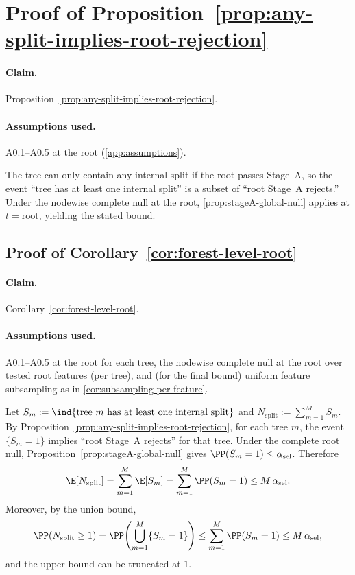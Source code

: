 \section{Proof of Proposition~\ref{prop:any-split-implies-root-rejection}}
\label{app:proof-root}

\paragraph{Claim.} Proposition~\ref{prop:any-split-implies-root-rejection}.
\paragraph{Assumptions used.} A0.1--A0.5 at the root (\cref{app:assumptions}).

The tree can only contain any internal split if the root passes Stage~A, so the
event ``tree has at least one internal split'' is a subset of ``root Stage~A
rejects.'' Under the nodewise complete null at the root, \cref{prop:stageA-global-null}
applies at $t = \mathrm{root}$, yielding the stated bound.

\subsection{Proof of Corollary~\ref{cor:forest-level-root}}
\label{app:proof-forest-level-root}

\paragraph{Claim.} Corollary~\ref{cor:forest-level-root}.
\paragraph{Assumptions used.} A0.1--A0.5 at the root for each tree, the nodewise
complete null at the root over tested root features (per tree), and (for the final bound)
uniform feature subsampling as in \cref{cor:subsampling-per-feature}.

Let $S_m := \ind\{\text{tree $m$ has at least one internal split}\}$ and
$N_{\mathrm{split}} := \sum_{m=1}^M S_m$.
By Proposition~\ref{prop:any-split-implies-root-rejection}, for each tree $m$,
the event $\{S_m=1\}$ implies ``root Stage~A rejects'' for that tree. Under the
complete root null, Proposition~\ref{prop:stageA-global-null} gives
$\PP(S_m=1) \le \alpha_{\mathrm{sel}}$. Therefore
%
\begin{equation}
  \E[N_{\mathrm{split}}]
  = \sum_{m=1}^M \E[S_m]
  = \sum_{m=1}^M \PP(S_m=1)
  \le M\,\alpha_{\mathrm{sel}}.
\end{equation}
%
Moreover, by the union bound,
%
\begin{equation}
  \PP(N_{\mathrm{split}} \ge 1)
  = \PP\!\left(\bigcup_{m=1}^M \{S_m=1\}\right)
  \le \sum_{m=1}^M \PP(S_m=1)
  \le M\,\alpha_{\mathrm{sel}},
\end{equation}
%
and the upper bound can be truncated at $1$.

